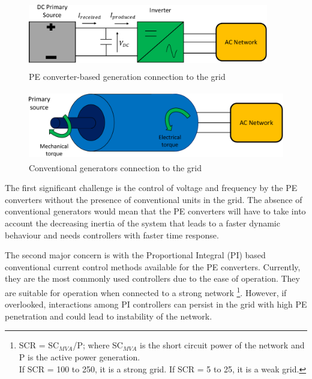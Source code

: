 \begin{figure}[H]
\centering
    \includegraphics[height = 3cm,width = 10.5cm]{Diagrams/Chapter_1/Energy_conv_system_2.pdf}
    \caption{PE converter-based generation connection to the grid \cite{denis_migrate_2018}}
    \label{fig:Energy_conv_system_2}
\end{figure}
\vspace{0mm}
\begin{figure}[H]
\centering
    \includegraphics[height = 3cm,width = 11.5cm]{Diagrams/Chapter_1/Energy_conv_system.pdf}
    \caption{Conventional generators connection to the grid \cite{denis_migrate_2018}}
    \label{fig:Energy_conv_system}
\end{figure}

The first significant challenge is the control of voltage and frequency by the \gls{PE} converters without the presence of conventional units in the grid. The absence of conventional generators would mean that the \gls{PE} converters will have to take into account the decreasing inertia of the system that leads to a faster dynamic behaviour and needs controllers with faster time response. 

The second major concern is with the Proportional Integral (\gls{PI}) based conventional current control methods available for the \gls{PE} converters. Currently, they are the most commonly used controllers due to the ease of operation. They are suitable for operation when connected to a strong network \footnote{SCR = SC$_{MVA}$/P;\; where SC$_{MVA}$ is the short circuit power of the network and P is the active power generation. \\
If SCR = 100 to 250, it is a strong grid. If SCR = 5 to 25, it is a weak grid.}. However, if overlooked, interactions among \gls{PI} controllers can persist in the grid with high \gls{PE} penetration and could lead to instability of the network.


